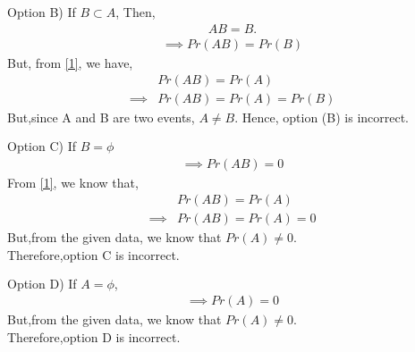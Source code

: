 \documentclass[journal,12pt,twocolumn]{IEEEtran}
\begin{document}
Option B) If $B \subset A$,
Then, 
\begin{align}
AB=B.
\end{align}
\begin{align}
\implies Pr(AB)=Pr(B)
\end{align}
But, from \eqref{1}, we have, 
\begin{align}
&Pr(AB)=Pr(A)\\
\implies &Pr(AB)=Pr(A)=Pr(B)
\end{align}
But,since A and B are two events, $A\neq B$. Hence, option (B) is incorrect.
\begin{align*}
\\
\end{align*}
Option C) If $B=\phi$
\begin{align}
\implies Pr(AB)=0
\end{align}From \eqref{1}, we know that,
\begin{align}
& Pr(AB)=Pr(A)\\
\implies & Pr(AB)=Pr(A)=0
\end{align}
But,from the given data, we know that $Pr(A) \neq 0$.\\
Therefore,option C is incorrect.
\begin{align*}
\\
\end{align*}
Option D) If $A=\phi$,
\begin{align}
\implies Pr(A)=0
\end{align}
But,from the given data, we know that $Pr(A) \neq 0$.\\
Therefore,option D is incorrect.
\end{document}
